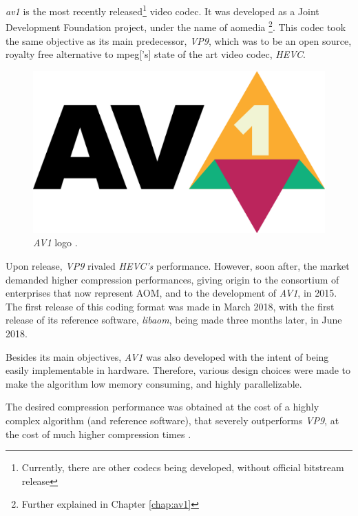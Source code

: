 \emph{\gls{av1}} is the most recently released\footnote{Currently, there are other codecs being developed, without official bitstream release} video codec. It was developed as a Joint Development Foundation \cite{JointDevelopmentFoundation} project, under the name of \gls{aomedia} \footnote{Further explained in Chapter \ref{chap:av1}}. This codec took the same objective as its main predecessor, \textit{VP9}, which was to be an open source, royalty free alternative to \gls{mpeg}['s] state of the art video codec, \textit{\gls{HEVC}}.

\begin{figure}[!htbp]
    \centering
    \includegraphics[width=\figwidth]{Sections/1Introduction/Images/av1.png}
    \caption[\emph{AV1} logo]{\emph{AV1} logo \cite{aomediaHome}.} 
    \label{fig:av1}
\end{figure}

Upon release, \textit{VP9} rivaled \textit{HEVC's} performance. However, soon after, the market demanded higher compression performances, giving origin to the consortium of  enterprises that now represent AOM, and to the development of \textit{AV1}, in 2015. The first release of this coding format was made in March 2018, with the first release of its reference software, \textit{\gls{libaom}}, being made three months later, in June 2018.

Besides its main objectives, \textit{AV1} was also developed with the intent of being easily implementable in hardware. Therefore, various design choices were made to make the algorithm low memory consuming, and highly parallelizable. 

The desired compression performance was obtained at the cost of a highly complex algorithm (and reference software), that severely outperforms \textit{VP9}, at the cost of much higher compression times \cite{groisPerformanceComparisonAV12018}.

